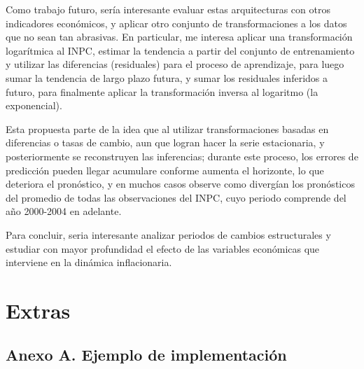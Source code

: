 \documentclass[12pt,letterpaper]{article}
\begin{document}
Como trabajo futuro, sería interesante evaluar
estas arquitecturas con otros indicadores
económicos, y aplicar otro conjunto de transformaciones a los datos que no sean tan abrasivas. En particular, me interesa aplicar una transformación logarítmica al INPC, estimar la tendencia a partir del conjunto de entrenamiento y utilizar las diferencias (residuales) para el proceso de aprendizaje, para luego sumar la tendencia de largo plazo futura, y sumar los residuales inferidos a futuro, para finalmente aplicar la transformación inversa al logaritmo (la exponencial).

Esta propuesta parte de la idea que al utilizar transformaciones basadas en diferencias o tasas de cambio, aun que logran hacer la serie estacionaria, y posteriormente se reconstruyen las inferencias; durante este proceso, los errores de predicción pueden llegar acumulare conforme aumenta el horizonte, lo que deteriora el pronóstico, y en muchos casos observe como divergían los pronósticos del promedio de todas las observaciones del INPC, cuyo periodo comprende del año 2000-2004 en adelante.

Para concluir, seria interesante analizar periodos de cambios estructurales y estudiar con mayor profundidad el efecto de las variables económicas que interviene en la dinámica inflacionaria.

\section{Extras}
\label{sec:extras}

\subsection*{Anexo A. Ejemplo de implementación}
{}
\end{document}
